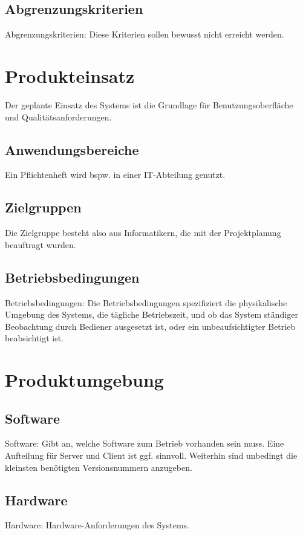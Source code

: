 \documentclass[a4paper]{scrreprt}
\begin{document}
\section{Abgrenzungskriterien}
Abgrenzungskriterien: Diese Kriterien sollen bewusst nicht erreicht werden.
 
\chapter{Produkteinsatz}
Der geplante Einsatz des Systems ist die Grundlage für Benutzungsoberfläche und
Qualitätsanforderungen.
 
\section{Anwendungsbereiche}
Ein Pflichtenheft wird bspw. in einer IT-Abteilung genutzt.
 
\section{Zielgruppen}
Die Zielgruppe besteht also aus Informatikern, die mit der Projektplanung
beauftragt wurden.
 
\section{Betriebsbedingungen}
Betriebsbedingungen: Die Betriebsbedingungen spezifiziert die physikalische
Umgebung des Systems, die tägliche Betriebszeit, und ob das System ständiger
Beobachtung durch Bediener ausgesetzt ist, oder ein unbeaufsichtigter Betrieb
beabsichtigt ist.
 
\chapter{Produktumgebung}
 
\section{Software}
Software: Gibt an, welche Software zum Betrieb vorhanden sein muss. Eine
Aufteilung für Server und Client ist ggf. sinnvoll. Weiterhin sind unbedingt die
kleinsten benötigten Versionsnummern anzugeben.
 
\section{Hardware}
Hardware: Hardware-Anforderungen des Systems.
 
\end{document}
